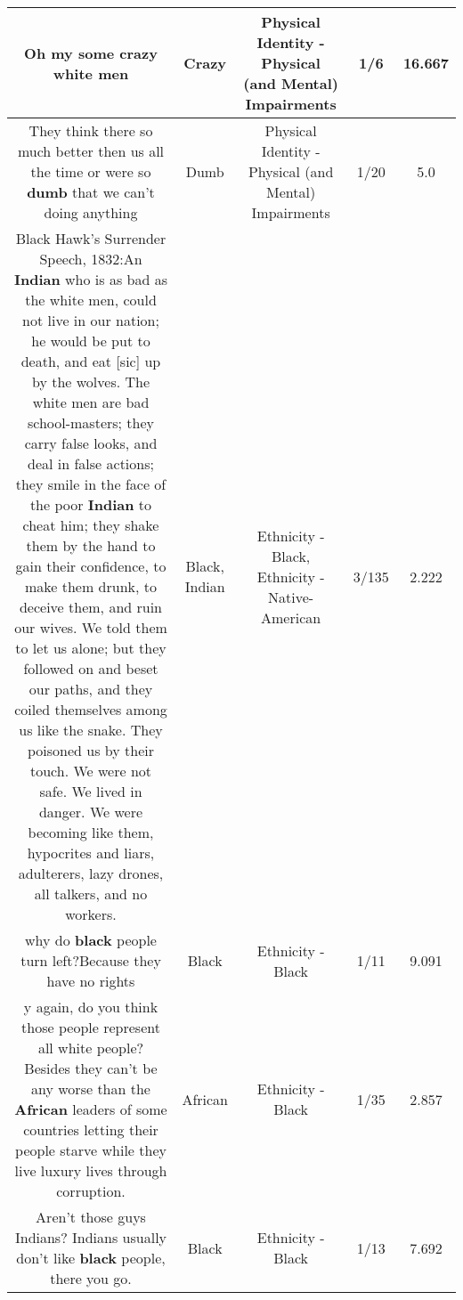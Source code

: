 \documentclass[11pt]{article}
\newlength\mylength
\begin{document}
\begin{center}
\begin{longtable}{|C{.65\mylength}|C{.30\mylength}|C{.12\mylength}|C{.12\mylength}|C{.12\mylength}|}
  \small Oh my some \textbf{crazy} white men\normalsize   & Crazy & Physical Identity - Physical (and Mental) Impairments & 1/6 & 16.667 \\  \hline
  \small They think there so much better then us all the time or were so \textbf{dumb} that we can't doing anything\normalsize   & Dumb & Physical Identity - Physical (and Mental) Impairments & 1/20 & 5.0 \\  \hline
  \small Black Hawk's Surrender Speech, 1832:An \textbf{Indian} who is as bad as the white men, could not live in our nation; he would be put to death, and eat [sic] up by the wolves. The white men are bad school-masters; they carry false looks, and deal in false actions; they smile in the face of the poor \textbf{Indian} to cheat him; they shake them by the hand to gain their confidence, to make them drunk, to deceive them, and ruin our wives. We told them to let us alone; but they followed on and beset our paths, and they coiled themselves among us like the snake. They poisoned us by their touch. We were not safe. We lived in danger. We were becoming like them, hypocrites and liars, adulterers, lazy drones, all talkers, and no workers.\normalsize   & Black, Indian & Ethnicity - Black, Ethnicity - Native-American & 3/135 & 2.222 \\  \hline
  \small why do \textbf{black} people turn left?Because they have no rights\normalsize   & Black & Ethnicity - Black & 1/11 & 9.091 \\  \hline
  \small y again, do you think those people represent all white people? Besides they can't be any worse than the \textbf{African} leaders of some countries letting their people starve while they live luxury lives through corruption.\normalsize   & African & Ethnicity - Black & 1/35 & 2.857 \\  \hline
  \small Aren't those guys Indians? Indians usually don't like \textbf{black} people, there you go.\normalsize   & Black & Ethnicity - Black & 1/13 & 7.692 \\  \hline

\end{longtable}
\end{center}
\end{document}
